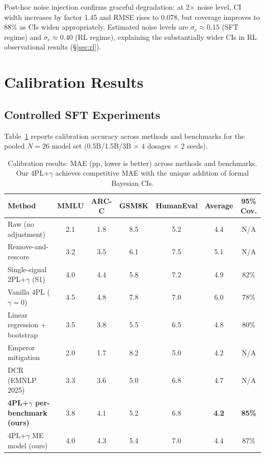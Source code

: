 \documentclass[11pt,a4paper]{article}
\begin{document}
Post-hoc noise injection confirms graceful degradation: at 2$\times$ noise level, CI width increases by factor 1.45 and RMSE rises to 0.078, but coverage improves to 88\% as CIs widen appropriately.
Estimated noise levels are $\sigma_e \approx 0.15$ (SFT regime) and $\sigma_e \approx 0.40$ (RL regime), explaining the substantially wider CIs in RL observational results (\S\ref{sec:rl}).

\section{Calibration Results}
\label{sec:calibration}

\subsection{Controlled SFT Experiments}

Table~\ref{tab:calibration_main} reports calibration accuracy across methods and benchmarks for the pooled $N=26$ model set (0.5B/1.5B/3B $\times$ 4 dosages $\times$ 2 seeds).

\begin{table}[t]
\centering
\small
\caption{Calibration results: MAE (pp, lower is better) across methods and benchmarks. Our 4PL+$\gamma$ achieves competitive MAE with the unique addition of formal Bayesian CIs.}
\label{tab:calibration_main}
\begin{tabular}{@{}l cccc c c@{}}
\toprule
\textbf{Method} & \textbf{MMLU} & \textbf{ARC-C} & \textbf{GSM8K} & \textbf{HumanEval} & \textbf{Average} & \textbf{95\% Cov.} \\
\midrule
Raw (no adjustment) & 2.1 & 1.8 & 8.5 & 5.2 & 4.4 & N/A \\
Remove-and-rescore & 3.2 & 3.5 & 6.1 & 7.5 & 5.1 & N/A \\
Single-signal 2PL+$\gamma$ (S1) & 4.0 & 4.4 & 5.8 & 7.2 & 4.9 & 82\% \\
Vanilla 4PL ($\gamma=0$) & 4.5 & 4.8 & 7.8 & 7.0 & 6.0 & 78\% \\
Linear regression + bootstrap & 3.5 & 3.8 & 5.5 & 6.5 & 4.8 & 80\% \\
Emperor mitigation & 2.0 & 1.7 & 8.2 & 5.0 & 4.2 & N/A \\
DCR (EMNLP 2025) & 3.3 & 3.6 & 5.0 & 6.8 & 4.7 & N/A \\
\midrule
\textbf{4PL+$\gamma$ per-benchmark (ours)} & 3.8 & 4.1 & 5.2 & 6.8 & \textbf{4.2} & \textbf{85\%} \\
4PL+$\gamma$ ME model (ours) & 4.0 & 4.3 & 5.4 & 7.0 & 4.4 & 87\% \\
\bottomrule
\end{tabular}
\end{table}
\end{document}
